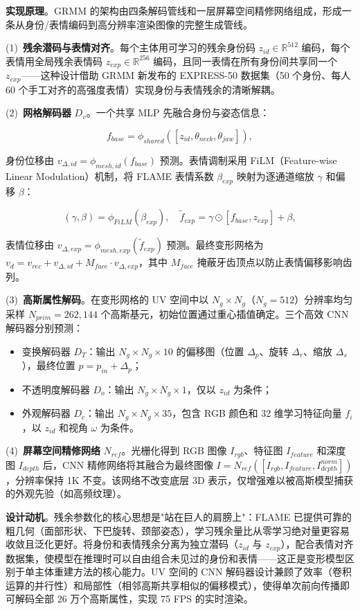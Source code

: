 \textbf{实现原理}。GRMM 的架构由四条解码管线和一层屏幕空间精修网络组成，形成一条从身份/表情编码到高分辨率渲染图像的完整生成管线。

(1)~\textbf{残余潜码与表情对齐}。每个主体用可学习的残余身份码 $z_{id} \in \mathbb{R}^{512}$ 编码，每个表情用全局残余表情码 $z_{exp} \in \mathbb{R}^{256}$ 编码，且同一表情在所有身份间共享同一个 $z_{exp}$——这种设计借助 GRMM 新发布的 EXPRESS-50 数据集（50 个身份、每人 60 个手工对齐的高强度表情）实现身份与表情残余的清晰解耦。

(2)~\textbf{网格解码器} $D_v$。一个共享 MLP 先融合身份与姿态信息：

\[
f_{base} = \phi_{shared}([z_{id}, \theta_{neck}, \theta_{jaw}]),
\]

身份位移由 $v_{\Delta,id} = \phi_{mesh,id}(f_{base})$ 预测。表情调制采用 FiLM（Feature-wise Linear Modulation）机制，将 FLAME 表情系数 $\beta_{exp}$ 映射为逐通道缩放 $\gamma$ 和偏移 $\beta$：

\[
(\gamma, \beta) = \phi_{FiLM}(\beta_{exp}), \quad \tilde{f}_{exp} = \gamma \odot [f_{base}, z_{exp}] + \beta,
\]

表情位移由 $v_{\Delta,exp} = \phi_{mesh,exp}(\tilde{f}_{exp})$ 预测。最终变形网格为 $v_d = v_{rec} + v_{\Delta,id} + M_{face} \cdot v_{\Delta,exp}$，其中 $M_{face}$ 掩蔽牙齿顶点以防止表情偏移影响齿列。

(3)~\textbf{高斯属性解码}。在变形网格的 UV 空间中以 $N_g \times N_g$（$N_g = 512$）分辨率均匀采样 $N_{prim} = 262{,}144$ 个高斯基元，初始位置通过重心插值确定。三个高效 CNN 解码器分别预测：
\begin{itemize}
\item 变换解码器 $D_T$：输出 $N_g \times N_g \times 10$ 的偏移图（位置 $\Delta_p$、旋转 $\Delta_r$、缩放 $\Delta_s$），最终位置 $p = p_{in} + \Delta_p$；
\item 不透明度解码器 $D_o$：输出 $N_g \times N_g \times 1$，仅以 $z_{id}$ 为条件；
\item 外观解码器 $D_c$：输出 $N_g \times N_g \times 35$，包含 RGB 颜色和 32 维学习特征向量 $f_i$，以 $z_{id}$ 和视角 $\omega$ 为条件。
\end{itemize}

(4)~\textbf{屏幕空间精修网络} $N_{ref}$。光栅化得到 RGB 图像 $I_{rgb}$、特征图 $I_{feature}$ 和深度图 $I_{depth}$ 后，CNN 精修网络将其融合为最终图像 $I = N_{ref}([I_{rgb}, I_{feature}, I_{depth}^{norm}])$，分辨率保持 1K 不变。该网络不改变底层 3D 表示，仅增强难以被高斯模型捕获的外观先验（如高频纹理）。

\textbf{设计动机}。残余参数化的核心思想是"站在巨人的肩膀上"：FLAME 已提供可靠的粗几何（面部形状、下巴旋转、颈部姿态），学习残余量比从零学习绝对量更容易收敛且泛化更好。将身份和表情残余分离为独立潜码（$z_{id}$ 与 $z_{exp}$），配合表情对齐数据集，使模型在推理时可以自由组合未见过的身份和表情——这正是变形模型区别于单主体重建方法的核心能力。UV 空间的 CNN 解码器设计兼顾了效率（卷积运算的并行性）和局部性（相邻高斯共享相似的偏移模式），使得单次前向传播即可解码全部 26 万个高斯属性，实现 75 FPS 的实时渲染。


